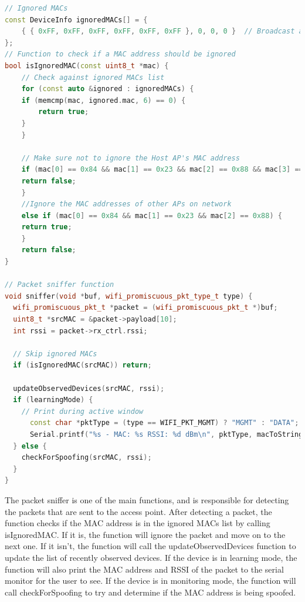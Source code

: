\documentclass[letterpaper, 11pt]{article}
\begin{document}
\newpage
\begin{lstlisting}[language=C++, caption=Packet Sniffer and MAC Filter, label=lst:main_code]
// Ignored MACs
const DeviceInfo ignoredMACs[] = {
    { { 0xFF, 0xFF, 0xFF, 0xFF, 0xFF, 0xFF }, 0, 0, 0 }  // Broadcast address
};
// Function to check if a MAC address should be ignored
bool isIgnoredMAC(const uint8_t *mac) {
    // Check against ignored MACs list
    for (const auto &ignored : ignoredMACs) {
    if (memcmp(mac, ignored.mac, 6) == 0) {
        return true;
    }
    }

    // Make sure not to ignore the Host AP's MAC address
    if (mac[0] == 0x84 && mac[1] == 0x23 && mac[2] == 0x88 && mac[3] == 0x7B && mac[4] == 0x90 && mac[5] == 0xA0) { 
    return false;
    } 
    //Ignore the MAC addresses of other APs on network
    else if (mac[0] == 0x84 && mac[1] == 0x23 && mac[2] == 0x88) {
    return true;
    }
    return false;
}

// Packet sniffer function
void sniffer(void *buf, wifi_promiscuous_pkt_type_t type) {
  wifi_promiscuous_pkt_t *packet = (wifi_promiscuous_pkt_t *)buf;
  uint8_t *srcMAC = &packet->payload[10];
  int rssi = packet->rx_ctrl.rssi;

  // Skip ignored MACs
  if (isIgnoredMAC(srcMAC)) return;
  
  updateObservedDevices(srcMAC, rssi);
  if (learningMode) {
    // Print during active window
      const char *pktType = (type == WIFI_PKT_MGMT) ? "MGMT" : "DATA";
      Serial.printf("%s - MAC: %s RSSI: %d dBm\n", pktType, macToString(srcMAC).c_str(), rssi);
  } else {
    checkForSpoofing(srcMAC, rssi);
  }
} 
\end{lstlisting}
The packet sniffer is one of the main functions, and is responsible for detecting the packets that are sent to the access point. After detecting a packet, the function checks if the MAC address
is in the ignored MACs list by calling isIgnoredMAC. If it is, the function will ignore the packet and move on to the next one. If it isn't, the function will call the updateObservedDevices 
function to update the list of recently observed devices. If the device is in learning mode, the function will also print the MAC address and RSSI of the packet to the serial monitor for the 
user to see. If the device is in monitoring mode, the function will call checkForSpoofing to try and determine if the MAC address is being spoofed.
\end{document}

